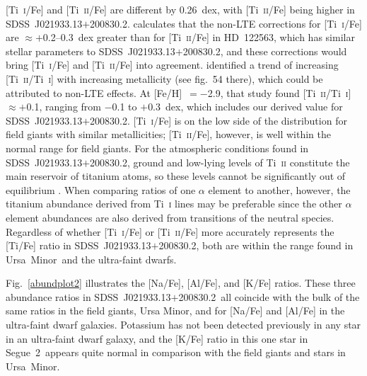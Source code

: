 \documentclass[useAMS,usenatbib,usegraphicx]{mn2e}
\def\seg{\mbox{SDSS~J021933.13$+$200830.2}}
\def\seggal{\mbox{Segue~2}}
\def\umigal{\mbox{Ursa Minor}}
\def\hd{\mbox{HD~122563}}
\begin{document}
[Ti~\textsc{i}/Fe] and [Ti~\textsc{ii}/Fe]
are different by 0.26~dex, with [Ti~\textsc{ii}/Fe] being higher in \seg.
\citet{bergemann11} calculates that the non-LTE corrections
for [Ti~\textsc{i}/Fe] are $\approx +$0.2--0.3~dex
greater than for [Ti~\textsc{ii}/Fe] in \hd,
which has similar stellar parameters to \seg,
and these corrections would bring 
[Ti~\textsc{i}/Fe] and [Ti~\textsc{ii}/Fe] into agreement.
\citet{roederer14} identified a trend of increasing
[Ti~\textsc{ii}/Ti~\textsc{i}] with increasing metallicity
(see fig.~54 there),
which could be attributed to non-LTE effects.
At [Fe/H]~$= -$2.9, that study found 
[Ti~\textsc{ii}/Ti~\textsc{i}]~$\approx +$0.1, ranging from
$-$0.1 to $+$0.3~dex,
which includes our derived value for \seg.
[Ti~\textsc{i}/Fe] is
on the low side of the distribution for field giants
with similar metallicities;
[Ti~\textsc{ii}/Fe], however, is well within the normal
range for field giants.
For the atmospheric conditions found in \seg,
ground and low-lying levels of Ti~\textsc{ii} constitute the main
reservoir of titanium atoms,
so these levels cannot be significantly out of equilibrium
\citep{lawler13}.
When comparing ratios of one $\alpha$ element to another, 
however, the titanium abundance derived from Ti~\textsc{i}
lines may be preferable since the other $\alpha$ element abundances
are also derived from transitions of the neutral species.
Regardless of whether [Ti~\textsc{i}/Fe] or [Ti~\textsc{ii}/Fe]
more accurately represents the [Ti/Fe] ratio in \seg,
both are within the range found in \umigal\ and the
ultra-faint dwarfs.

Fig.~\ref{abundplot2} illustrates the [Na/Fe], [Al/Fe], and [K/Fe] ratios.
These three abundance ratios in \seg\ all coincide with
the bulk of the same ratios in the field giants, 
Ursa Minor, and for [Na/Fe] and [Al/Fe] in the
ultra-faint dwarf galaxies.
Potassium has not been detected previously in 
any star in an ultra-faint dwarf galaxy,
and the [K/Fe] ratio in this one star in \seggal\ 
appears quite normal in comparison with the field giants
and stars in \umigal.
\end{document}
